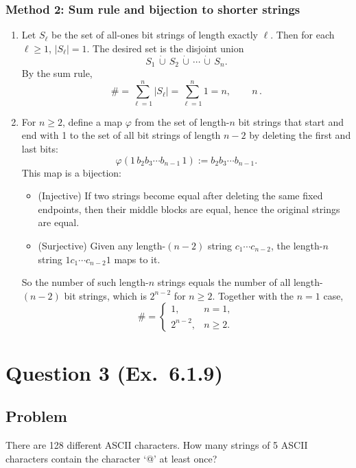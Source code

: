 \documentclass[12pt]{article}
\begin{document}
\subsubsection{Method 2: Sum rule and bijection to shorter strings}
\begin{enumerate}[label=(\alph*)]
\item Let $S_\ell$ be the set of all-ones bit strings of length exactly $\ell$.
Then for each $\ell\ge 1$, $|S_\ell|=1$.
The desired set is the disjoint union
\[
S_1 \,\dot\cup\, S_2 \,\dot\cup\, \cdots \,\dot\cup\, S_n.
\]
By the sum rule,
\[
\#=\sum_{\ell=1}^n |S_\ell|=\sum_{\ell=1}^n 1 = n,
\qquad
\boxed{\,n\,}.
\]

\item For $n\ge 2$, define a map $\varphi$ from the set of length-$n$ bit strings that start and end with 1 to the set of all bit strings of length $n-2$ by deleting the first and last bits:
\[
\varphi(1\,b_2 b_3 \cdots b_{n-1}\,1) := b_2 b_3 \cdots b_{n-1}.
\]
This map is a bijection:
\begin{itemize}[leftmargin=*]
\item (Injective) If two strings become equal after deleting the same fixed endpoints, then their middle blocks are equal, hence the original strings are equal.
\item (Surjective) Given any length-$(n-2)$ string $c_1\cdots c_{n-2}$, the length-$n$ string $1c_1\cdots c_{n-2}1$ maps to it.
\end{itemize}
So the number of such length-$n$ strings equals the number of all length-$(n-2)$ bit strings, which is $2^{n-2}$ for $n\ge 2$.
Together with the $n=1$ case,
\[
\boxed{\,
\#=
\begin{cases}
1, & n=1,\\
2^{n-2}, & n\ge 2.
\end{cases}
\,}
\]
\end{enumerate}


\newpage
\section{Question 3 (Ex.\ 6.1.9)}
\subsection{Problem}
There are 128 different ASCII characters. How many strings of 5 ASCII characters contain the character `@' at least once?
\end{document}
